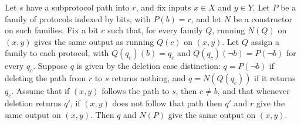 \begin{lemma}
\label{CommunicationComplexity.Deterministic.Protocol.deletePath_run_outside_branch}
\leanok
{}
Let $s$ have a subprotocol path into $r$, and fix inputs $x\in X$ and $y\in Y$. Let $P$
be a family of protocols indexed by bits, with $P(b)=r$, and let $N$ be a constructor on
such families. Fix a bit $c$ such that, for every family $Q$, running $N(Q)$ on $(x,y)$
gives the same output as running $Q(c)$ on $(x,y)$. Let $Q$ assign a family to each
protocol, with $Q(q_c)(b)=q_c$ and $Q(q_c)(\neg b)=P(\neg b)$ for every $q_c$. Suppose
$q$ is given by the deletion case distinction: $q=P(\neg b)$ if deleting the path from
$r$ to $s$ returns nothing, and $q=N(Q(q_c))$ if it returns $q_c$. Assume that if
$(x,y)$ follows the path to $s$, then $c\ne b$, and that whenever deletion returns $q'$,
if $(x,y)$ does not follow that path then $q'$ and $r$ give the same output on $(x,y)$.
Then $q$ and $N(P)$ give the same output on $(x,y)$.
\end{lemma}
